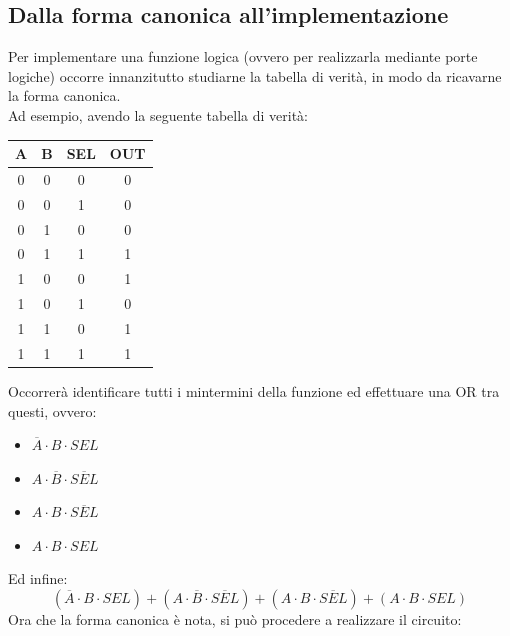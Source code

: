 \documentclass[12pt]{article}
\begin{document}
\subsection{Dalla forma canonica all'implementazione}
Per implementare una funzione logica (ovvero per realizzarla mediante porte logiche) occorre innanzitutto studiarne la tabella di verità, in modo da ricavarne la forma canonica.\\
Ad esempio, avendo la seguente tabella di verità:\\
\begin{center}
    \begin{tabular}{|| c c c | c ||}
        \hline
        A & B & SEL & OUT\\
        \hline
        0 & 0 & 0 & 0\\
        \hline
        0 & 0 & 1 & 0\\
        \hline
        0 & 1 & 0 & 0\\
        \hline
        0 & 1 & 1 & 1\\
        \hline
        1 & 0 & 0 & 1\\
        \hline
        1 & 0 & 1 & 0\\
        \hline
        1 & 1 & 0 & 1\\
        \hline
        1 & 1 & 1 & 1\\
        \hline
    \end{tabular}
\end{center}
Occorrerà identificare tutti i mintermini della funzione ed effettuare una OR tra questi, ovvero:
\begin{itemize}
    \item $\overline{A} \cdot B \cdot SEL$
    \item $A \cdot \overline{B} \cdot \overline{SEL}$
    \item $A \cdot B \cdot \overline{SEL}$
    \item $A \cdot B \cdot SEL$
\end{itemize}
Ed infine:
\[
    (\overline{A} \cdot B \cdot SEL) + (A \cdot \overline{B} \cdot \overline{SEL}) + (A \cdot B \cdot \overline{SEL}) + (A \cdot B \cdot SEL)
\]
Ora che la forma canonica è nota, si può procedere a realizzare il circuito:
\end{document}
